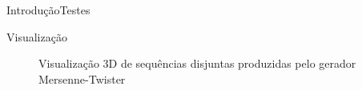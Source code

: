 \documentclass[10pt,xcolor={dvipsnames}]{beamer}
\begin{document}
\begin{frame}{Introdução}{Testes}
\begin{block}{Visualização}
	\begin{figure}[hbt]
		\centering
		\pause
		\caption{Visualização 3D de sequências disjuntas produzidas pelo gerador Mersenne-Twister}\label{fig:3DMT}
	\end{figure}
\end{block}
\end{frame}
\end{document}
